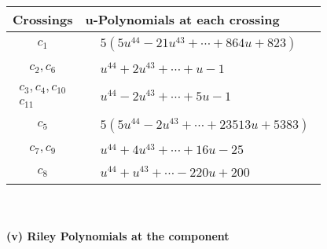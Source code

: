 \documentclass[1p]{elsarticle_modified}
\theoremstyle{definition}
\begin{document}
\begin{tabular}{m{50pt}|m{274pt}}
Crossings & \hspace{64pt}u-Polynomials at each crossing \\
\hline $$\begin{aligned}c_{1}\end{aligned}$$&$\begin{aligned}
&5(5 u^{44}-21 u^{43}+\cdots+864 u+823)
\end{aligned}$\\
\hline $$\begin{aligned}c_{2},c_{6}\end{aligned}$$&$\begin{aligned}
&u^{44}+2 u^{43}+\cdots+u-1
\end{aligned}$\\
\hline $$\begin{aligned}c_{3},c_{4},c_{10}\\c_{11}\end{aligned}$$&$\begin{aligned}
&u^{44}-2 u^{43}+\cdots+5 u-1
\end{aligned}$\\
\hline $$\begin{aligned}c_{5}\end{aligned}$$&$\begin{aligned}
&5(5 u^{44}-2 u^{43}+\cdots+23513 u+5383)
\end{aligned}$\\
\hline $$\begin{aligned}c_{7},c_{9}\end{aligned}$$&$\begin{aligned}
&u^{44}+4 u^{43}+\cdots+16 u-25
\end{aligned}$\\
\hline $$\begin{aligned}c_{8}\end{aligned}$$&$\begin{aligned}
&u^{44}+u^{43}+\cdots-220 u+200
\end{aligned}$\\
\hline
\end{tabular}\\~\\
\newpage\renewcommand{\arraystretch}{1}
\flushleft \textbf{(v) Riley Polynomials at the component}\newline \\
\end{document}
